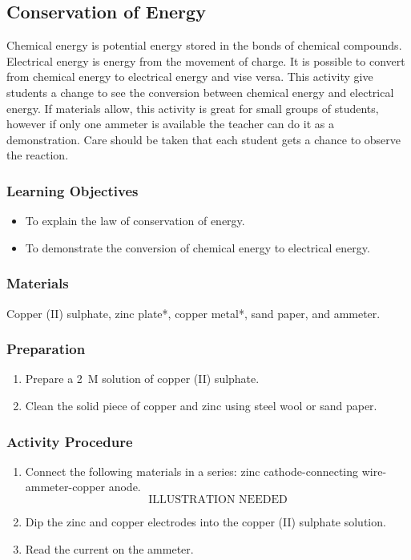 \subsection{Conservation of Energy}
Chemical energy is potential energy stored in the bonds of chemical compounds. Electrical energy is energy from the movement of charge. It is possible to convert from chemical energy to electrical energy and vise versa. This activity give students a change to see the conversion between chemical energy and electrical energy. If materials allow, this activity is great for small groups of students, however if only one ammeter is available the teacher can do it as a demonstration. Care should be taken that each student gets a chance to observe the reaction. 
\subsubsection*{Learning Objectives}
\begin{itemize}
\item{To explain the law of conservation of energy.}
\item{To demonstrate the conversion of chemical energy to electrical energy.}
\end{itemize}

\subsubsection*{Materials}
Copper (II) sulphate, zinc plate*, copper metal*, sand paper, and ammeter.

\subsubsection*{Preparation}
\begin{enumerate}
\item{Prepare a 2~M solution of copper (II) sulphate.}
\item{Clean the solid piece of copper and zinc using steel wool or sand paper.}
\end{enumerate}

\subsubsection*{Activity Procedure}
\begin{enumerate}
\item{Connect the following materials in a series: zinc cathode-connecting wire-ammeter-copper anode. 
$$\mbox{ILLUSTRATION NEEDED}$$ }
\item{Dip the zinc and copper electrodes into the copper (II) sulphate solution.}
\item{Read the current on the ammeter.}
\end{enumerate}

